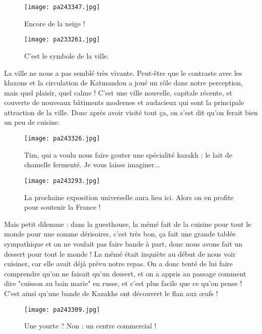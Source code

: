 \documentclass{book}
\begin{document}
\begin{figure}[h]
\centering
\texttt{[image: pa243347.jpg]}
\caption*{Encore de la neige !}
\end{figure}


\begin{figure}[h]
\centering
\texttt{[image: pa233261.jpg]}
\caption*{C'est le symbole de la ville.}
\end{figure}

La ville ne nous a pas semblé très vivante. Peut-être que le contraste avec les klaxons et la circulation de Katmandou a joué un rôle dans notre perception, mais quel plaisir, quel calme ! C'est une ville nouvelle, capitale récente, et couverte de nouveaux bâtiments modernes et audacieux qui sont la principale attraction de la ville. Donc après avoir visité tout ça, on s'est dit qu'on ferait bien un peu de cuisine.


\begin{figure}[h]
\centering
\texttt{[image: pa243326.jpg]}
\caption*{Tim, qui a voulu nous faire gouter une spécialité kazakh : le lait de chamelle fermenté. Je vous laisse imaginer...}
\end{figure}


\begin{figure}[h]
\centering
\texttt{[image: pa243293.jpg]}
\caption*{La prochaine exposition universelle aura lieu ici. Alors on en profite pour soutenir la France !}
\end{figure}

Mais petit dilemme : dans la guesthouse, la mémé fait de la cuisine pour tout le monde pour une somme dérisoires, c'est très bon, ça fait une grande tablée sympathique et on ne voulait pas faire bande à part, donc nous avons fait un dessert pour tout le monde ! La mémé était inquiète au début de nous voir cuisiner, car elle avait déjà prévu notre repas. On a donc tenté de lui faire comprendre qu'on ne faisait qu'un dessert, et on a appris au passage comment dire "cuisson au bain marie" en russe, et c'est plus facile que ce qu'on pense ! C'est ainsi qu'une bande de Kazakhs ont découvert le flan aux œufs !


\begin{figure}[h]
\centering
\texttt{[image: pa243309.jpg]}
\caption*{Une yourte ? Non : un centre commercial !}
\end{figure}
\end{document}
